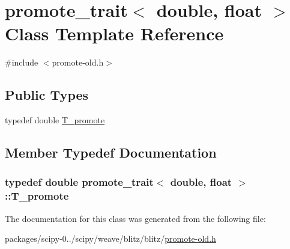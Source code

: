 \hypertarget{classpromote__trait_3_01double_00_01float_01_4}{}\section{promote\+\_\+trait$<$ double, float $>$ Class Template Reference}
\label{classpromote__trait_3_01double_00_01float_01_4}


{\ttfamily \#include $<$promote-\/old.\+h$>$}

\subsection*{Public Types}
\begin{DoxyCompactItemize}
\item 
typedef double \hyperlink{classpromote__trait_3_01double_00_01float_01_4_a247a1537fc7214eec7ef04037f3f81e6}{T\+\_\+promote}
\end{DoxyCompactItemize}


\subsection{Member Typedef Documentation}
\hypertarget{classpromote__trait_3_01double_00_01float_01_4_a247a1537fc7214eec7ef04037f3f81e6}{}
\subsubsection[{T\+\_\+promote}]{\setlength{\rightskip}{0pt plus 5cm}typedef double {\bf promote\+\_\+trait}$<$ double, float $>$\+::{\bf T\+\_\+promote}}\label{classpromote__trait_3_01double_00_01float_01_4_a247a1537fc7214eec7ef04037f3f81e6}


The documentation for this class was generated from the following file\+:\begin{DoxyCompactItemize}
\item 
packages/scipy-\/0../scipy/weave/blitz/blitz/\hyperlink{promote-old_8h}{promote-\/old.\+h}\end{DoxyCompactItemize}

